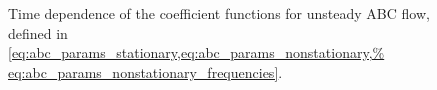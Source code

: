 \begin{figure}[htpb]
    \centering
    \caption[Time dependence of the coefficient functions for unsteady ABC flow]
    {Time dependence of the coefficient functions for unsteady ABC flow,
        defined in
        \cref{eq:abc_params_stationary,eq:abc_params_nonstationary,%
    eq:abc_params_nonstationary_frequencies}.}
    \label{fig:abc_timedep_coeff}
\end{figure}

